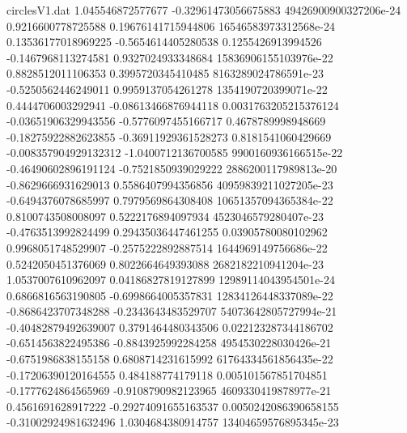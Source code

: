 \begin{filecontents}{circlesV1.dat}
1.045546872577677	-0.32961473056675883	49426900900327206e-24
0.9216600778725588	0.19676141715944806	16546583973312568e-24
0.13536177018969225	-0.5654614405280538	0.1255426913994526
-0.1467968113274581	0.9327024933348684	15836906155103976e-22
0.8828512011106353	0.3995720345410485	8163289024786591e-23
-0.5250562446249011	0.9959137054261278	1354190720399071e-22
0.4444706003292941	-0.08613466876944118	0.0031763205215376124
-0.03651906329943556	-0.5776097455166717	0.4678789998948669
-0.18275922882623855	-0.36911929361528273	0.8181541060429669
-0.008357904929132312	-1.0400712136700585	9900160936166515e-22
-0.46490602896191124	-0.7521850939029222	2886200117989813e-20
-0.8629666931629013	0.5586407994356856	40959839211027205e-23
-0.6494376078685997	0.7979569864308408	10651357094365384e-22
0.8100743508008097	0.5222176894097934	4523046579280407e-23
-0.4763513992824499	0.29435036447461255	0.03905780080102962
0.9968051748529907	-0.2575222892887514	1644969149756686e-22
0.5242050451376069	0.8022664649393088	2682182210941204e-23
1.0537007610962097	0.04186827819127899	12989114043954501e-24
0.6866816563190805	-0.6998664005357831	12834126448337089e-22
-0.8686423707348288	-0.2343643483529707	54073642805727994e-21
-0.40482879492639007	0.3791464480343506	0.022123287344186702
-0.6514563822495386	-0.8843925992284258	4954530228030426e-21
-0.6751986838155158	0.6808714231615992	61764334561856435e-22
-0.17206390120164555	0.484188774179118	0.005101567851704851
-0.1777624864565969	-0.9108790982123965	4609330419878977e-21
0.4561691628917222	-0.29274091655163537	0.0050242086390658155
-0.31002924981632496	1.0304684380914757	13404659576895345e-23
\end{filecontents}
